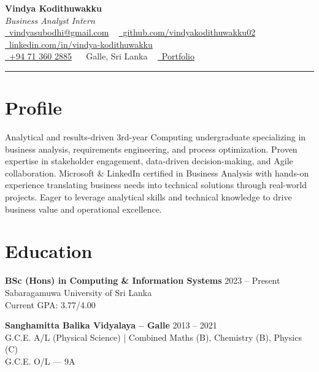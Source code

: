 \documentclass[letterpaper,10pt]{article}
\begin{document}
\begin{center}
{\Huge\color{accentTitle}\textbf{Vindya Kodithuwakku}}\\[3pt]
{\large\textit{Business Analyst Intern}}\\[4pt]
\href{mailto:vindyasubodhi@gmail.com}{\faEnvelope~vindyasubodhi@gmail.com} ~
\href{https://github.com/vindyakodithuwakku02}{\faGithub~github.com/vindyakodithuwakku02} ~
\href{https://www.linkedin.com/in/vindya-kodithuwakku-bb6187202}{\faLinkedin~linkedin.com/in/vindya-kodithuwakku}\\[2pt]
\href{tel:+94713602885}{\faPhone~+94 71 360 2885} ~
\faMapMarker*~Galle, Sri Lanka ~
\href{https://vindyakodithuwakku02.github.io/my_portfolio/}{\faGlobe~Portfolio}\\[4pt]
{\color{accentLine}\hrule}
\end{center}

\section{Profile}
\vspace{-1pt}
\justifying
Analytical and results-driven 3rd-year Computing undergraduate specializing in business analysis, requirements engineering, and process optimization. Proven expertise in stakeholder engagement, data-driven decision-making, and Agile collaboration. Microsoft \& LinkedIn certified in Business Analysis with hands-on experience translating business needs into technical solutions through real-world projects. Eager to leverage analytical skills and technical knowledge to drive business value and operational excellence.

\section{Education}
\vspace{-1pt}

\noindent\textbf{BSc (Hons) in Computing \& Information Systems} \hfill 2023 – Present\\
\noindent Sabaragamuwa University of Sri Lanka\\
\noindent Current GPA: 3.77/4.00

\vspace{2pt}
\noindent\textbf{Sanghamitta Balika Vidyalaya – Galle} \hfill 2013 – 2021\\
\noindent G.C.E. A/L (Physical Science) | Combined Maths (B), Chemistry (B), Physics (C)\\
\noindent G.C.E. O/L — 9A
\end{document}
